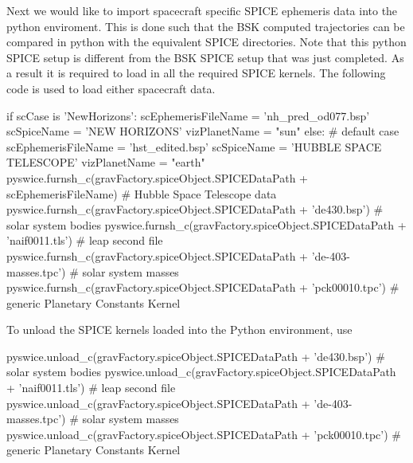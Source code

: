 Next we would like to import spacecraft specific S\+P\+I\+CE ephemeris data into the python enviroment. This is done such that the B\+SK computed trajectories can be compared in python with the equivalent S\+P\+I\+CE directories. Note that this python S\+P\+I\+CE setup is different from the B\+SK S\+P\+I\+CE setup that was just completed. As a result it is required to load in all the required S\+P\+I\+CE kernels. The following code is used to load either spacecraft data. 
\begin{DoxyCode}
\textcolor{keywordflow}{if} scCase \textcolor{keywordflow}{is} \textcolor{stringliteral}{'NewHorizons'}:
   scEphemerisFileName = \textcolor{stringliteral}{'nh\_pred\_od077.bsp'}
    scSpiceName = \textcolor{stringliteral}{'NEW HORIZONS'}
    vizPlanetName = \textcolor{stringliteral}{"sun"}
\textcolor{keywordflow}{else}:  \textcolor{comment}{# default case}
    scEphemerisFileName = \textcolor{stringliteral}{'hst\_edited.bsp'}
    scSpiceName = \textcolor{stringliteral}{'HUBBLE SPACE TELESCOPE'}
    vizPlanetName = \textcolor{stringliteral}{"earth"}
pyswice.furnsh\_c(gravFactory.spiceObject.SPICEDataPath + scEphemerisFileName)  \textcolor{comment}{# Hubble Space Telescope
       data}
pyswice.furnsh\_c(gravFactory.spiceObject.SPICEDataPath + \textcolor{stringliteral}{'de430.bsp'})  \textcolor{comment}{# solar system bodies}
pyswice.furnsh\_c(gravFactory.spiceObject.SPICEDataPath + \textcolor{stringliteral}{'naif0011.tls'})  \textcolor{comment}{# leap second file}
pyswice.furnsh\_c(gravFactory.spiceObject.SPICEDataPath + \textcolor{stringliteral}{'de-403-masses.tpc'})  \textcolor{comment}{# solar system masses}
pyswice.furnsh\_c(gravFactory.spiceObject.SPICEDataPath + \textcolor{stringliteral}{'pck00010.tpc'})  \textcolor{comment}{# generic Planetary Constants
       Kernel}
\end{DoxyCode}
 To unload the S\+P\+I\+CE kernels loaded into the Python environment, use 
\begin{DoxyCode}
pyswice.unload\_c(gravFactory.spiceObject.SPICEDataPath + \textcolor{stringliteral}{'de430.bsp'})  \textcolor{comment}{# solar system bodies}
pyswice.unload\_c(gravFactory.spiceObject.SPICEDataPath + \textcolor{stringliteral}{'naif0011.tls'})  \textcolor{comment}{# leap second file}
pyswice.unload\_c(gravFactory.spiceObject.SPICEDataPath + \textcolor{stringliteral}{'de-403-masses.tpc'})  \textcolor{comment}{# solar system masses}
pyswice.unload\_c(gravFactory.spiceObject.SPICEDataPath + \textcolor{stringliteral}{'pck00010.tpc'})  \textcolor{comment}{# generic Planetary Constants
       Kernel}
\end{DoxyCode}


